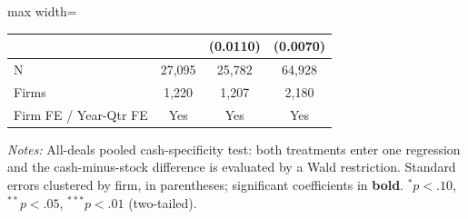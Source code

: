 \begin{table}[htbp]
\begin{adjustbox}{max width=\linewidth}
\begin{tabular}{lccc}
 &  & (0.0110) & (0.0070)  \\
\midrule
N & 27,095 & 25,782 & 64,928  \\
Firms & 1,220 & 1,207 & 2,180  \\
\midrule
Firm FE / Year-Qtr FE & Yes & Yes & Yes \\
\bottomrule\end{tabular}\end{adjustbox}
\begin{minipage}{\linewidth}\vspace{2pt}\scriptsize\textit{Notes:} All-deals pooled cash-specificity test: both treatments enter one regression and the cash-minus-stock difference is evaluated by a Wald restriction. Standard errors clustered by firm, in parentheses; significant coefficients in \textbf{bold}. $^{*}p<.10$, $^{**}p<.05$, $^{***}p<.01$ (two-tailed).\end{minipage}\end{table}

\clearpage

